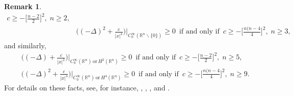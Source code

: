 \documentclass[reqno,11pt,centertags]{amsart}
\newcommand{\bbR}{{\mathbb{R}}}
\newcommand{\<}{\langle}
\renewcommand{\>}{\rangle}
\newcommand{\f}{\frac}
\numberwithin{equation}{section}
\theoremstyle{definition}
\newtheorem{remark}[theorem]{Remark}
\begin{document}
\begin{remark}
\begin{align}
c \geq - \bigg[\f{n-2}{2}\bigg]^2, \; n \geq 2,    \\
& \bigg((-\Delta)^2 + \f{c}{|x|^4}\bigg)\bigg|_{C_0^{\infty}(\bbR^n\backslash\{0\})} \geq 0 \, \text{ if and only if } \,
c \geq - \bigg[\f{n(n-4}{4}\bigg]^2, \; n \geq 3,    
\end{align}
and similarly, 
\begin{align}
& \bigg((-\Delta) + \f{c}{|x|^2}\bigg)\bigg|_{C_0^{\infty}(\bbR^n) \,\text{or}\, H^2(\bbR^n)} \geq 0 \, \text{ if and only if } \,
c \geq - \bigg[\f{n-2}{2}\bigg]^2, \; n \geq 5,    \\
& \bigg((-\Delta)^2 + \f{c}{|x|^4}\bigg)\bigg|_{C_0^{\infty}(\bbR^n) \,\text{or}\, H^4(\bbR^n)} \geq 0 \, \text{ if and only if } \, c \geq - \bigg[\f{n(n-4}{4}\bigg]^2, \; n \geq 9.   
\end{align}
For details on these facts, see, for instance, \cite[p.~213, 222]{BEL15}, \cite{Ok96}, \cite{OTY11}, and \cite[p.~90--101]{Re69}.


\end{remark}
\end{document}
